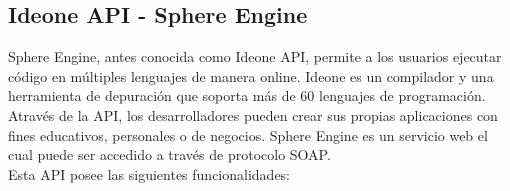 %

\subsection{Ideone API - Sphere Engine}
Sphere Engine, antes conocida como Ideone API, permite a los usuarios ejecutar código en múltiples lenguajes de manera online. Ideone es un compilador y una herramienta de depuración que soporta más de 60 lenguajes de programación. Através de la API, los desarrolladores pueden crear sus propias aplicaciones con fines educativos, personales o de negocios. Sphere Engine es un servicio web el cual puede ser accedido a través de protocolo SOAP.\\

Esta API posee las siguientes funcionalidades:

